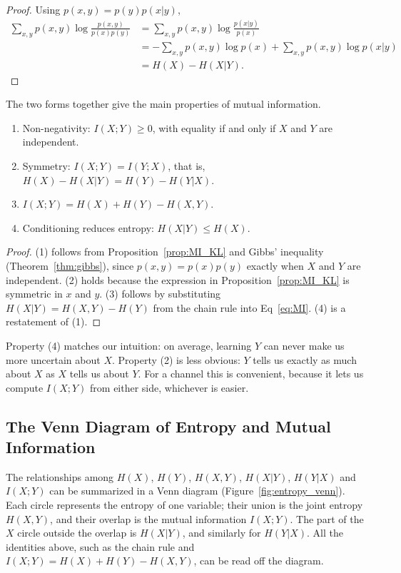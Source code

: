 \begin{proof}
Using \(p(x,y) = p(y)p(x|y)\),
\begin{align*}
    \sum_{x,y} p(x,y) \log \frac{p(x,y)}{p(x)p(y)} &= \sum_{x,y} p(x,y) \log \frac{p(x|y)}{p(x)} \\
    &= - \sum_{x,y} p(x,y) \log p(x) + \sum_{x,y} p(x,y) \log p(x|y) \\
    &= H(X) - H(X|Y).
\end{align*}
\end{proof}

The two forms together give the main properties of mutual information.

\begin{proposition}\label{prop:MI_props}
\begin{enumerate}
    \item Non-negativity: \(I(X;Y) \geq 0\), with equality if and only if \(X\) and \(Y\) are independent.
    \item Symmetry: \(I(X;Y) = I(Y;X)\), that is, \(H(X) - H(X|Y) = H(Y) - H(Y|X)\).
    \item \(I(X;Y) = H(X) + H(Y) - H(X,Y)\).
    \item Conditioning reduces entropy: \(H(X|Y) \leq H(X)\).
\end{enumerate}
\end{proposition}
\begin{proof}
(1) follows from Proposition~\ref{prop:MI_KL} and Gibbs' inequality (Theorem~\ref{thm:gibbs}), since \(p(x,y) = p(x)p(y)\) exactly when \(X\) and \(Y\) are independent. (2) holds because the expression in Proposition~\ref{prop:MI_KL} is symmetric in \(x\) and \(y\). (3) follows by substituting \(H(X|Y) = H(X,Y) - H(Y)\) from the chain rule into Eq~\ref{eq:MI}. (4) is a restatement of (1).
\end{proof}

Property (4) matches our intuition: on average, learning \(Y\) can never make us more uncertain about \(X\). Property (2) is less obvious: \(Y\) tells us exactly as much about \(X\) as \(X\) tells us about \(Y\). For a channel this is convenient, because it lets us compute \(I(X;Y)\) from either side, whichever is easier.

\subsection{The Venn Diagram of Entropy and Mutual Information}
The relationships among \(H(X)\), \(H(Y)\), \(H(X,Y)\), \(H(X|Y)\), \(H(Y|X)\) and \(I(X;Y)\) can be summarized in a Venn diagram (Figure~\ref{fig:entropy_venn}). Each circle represents the entropy of one variable; their union is the joint entropy \(H(X,Y)\), and their overlap is the mutual information \(I(X;Y)\). The part of the \(X\) circle outside the overlap is \(H(X|Y)\), and similarly for \(H(Y|X)\). All the identities above, such as the chain rule and \(I(X;Y) = H(X) + H(Y) - H(X,Y)\), can be read off the diagram.

